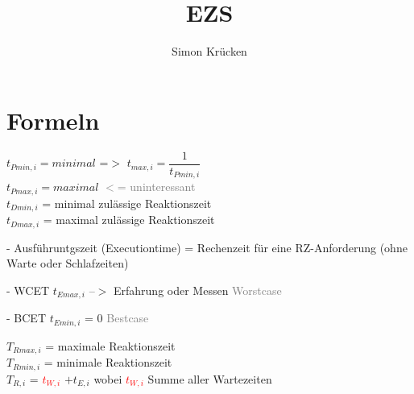 \documentclass[12pt,a4paper,oneside,ngerman]{article}
\title{EZS}
\author{Simon Krücken}
\begin{document}
    

\section[Formeln]{Formeln}

\(t_{Pmin,i} = minimal\) =$>$ \(t_{max,i} = \dfrac{1}{ t_{Pmin,i} }\) \\
\(t_{Pmax,i} = maximal\) \textcolor{gray}{$<$= uninteressant} \\
\(t_{Dmin,i}\) = minimal zulässige Reaktionszeit \\
\(t_{Dmax,i}\) = maximal zulässige Reaktionszeit

\begin{description}
    \item - Ausführuntgszeit (Executiontime) = Rechenzeit für eine RZ-Anforderung (ohne Warte oder Schlafzeiten)	
        \begin{description}
            \item - WCET \(t_{Emax,i}\) --$>$ Erfahrung oder Messen \textcolor{gray}{Worstcase}
            \item - BCET \(t_{Emin,i}\) = 0 \textcolor{gray}{Bestcase}
        \end{description}
    \end{description}

\(T_{Rmax,i}\) = maximale Reaktionszeit \\
\(T_{Rmin,i}\) = minimale Reaktionszeit \\
\(T_{R,i}\) = \textcolor{red}{\(t_{W,i}\)} \(+ t_{E,i}\) wobei \textcolor{red}{ \(t_{W,i}\) } Summe aller Wartezeiten
\end{document}
